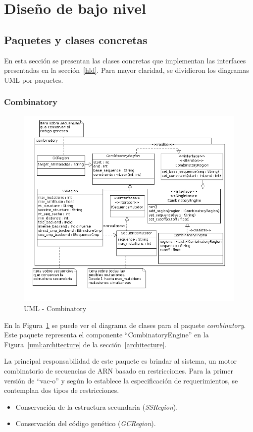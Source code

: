 \section{Dise\~no de bajo nivel}
\label{lld}  
  \subsection{Paquetes y clases concretas}
  En esta secci\'on se presentan las clases concretas que implementan las
interfaces presentadas en la secci\'on~\ref{hld}. Para mayor claridad, se
dividieron los diagramas UML por paquetes.

  \subsubsection{Combinatory}   
    \begin{figure}
      \centering
      \includegraphics[scale=0.5]{lld-combinatory.png}  
      \caption{UML - Combinatory}
      \label{uml:lld-combinatory}
    \end{figure}

  En la Figura~\ref{uml:lld-combinatory} se puede ver el diagrama de clases
para el paquete \textit{combinatory}. Este paquete representa el componente
``CombinatoryEngine'' en la Figura~\ref{uml:architecture} de la
secci\'on~\ref{architecture}.

  La principal responsabilidad de este paquete es brindar al sistema, un motor
combinatorio de secuencias de ARN basado en restricciones. Para la primer
versi\'on de ``vac-o'' y seg\'un lo establece la especificaci\'on de
requerimientos, se contemplan dos tipos de restricciones.
  \begin{itemize}
   \item Conservaci\'on de la estructura secundaria (\textit{SSRegion}).
   \item Conservaci\'on del c\'odigo gen\'etico (\textit{GCRegion}).
  \end{itemize}

